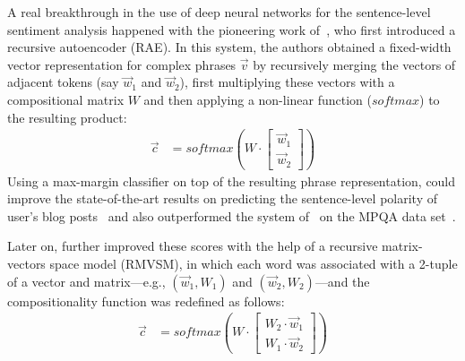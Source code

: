 A real breakthrough in the use of deep neural networks for the
sentence-level sentiment analysis happened with the pioneering work
of~\citet{Socher:11}, who first introduced a recursive autoencoder
(RAE).  In this system, the authors obtained a fixed-width vector
representation for complex phrases $\vec{v}$ by recursively merging
the vectors of adjacent tokens (say $\vec{w}_1$ and $\vec{w}_2$),
first multiplying these vectors with a compositional matrix $W$ and
then applying a non-linear function ($softmax$) to the resulting
product:
\begin{align*}
  \vec{c} &= softmax\left(W\cdot\begin{bmatrix}
  \vec{w}_1\\
  \vec{w}_2
  \end{bmatrix}\right)
\end{align*}
Using a max-margin classifier on top of the resulting phrase
representation, \citet{Socher:11} could improve the state-of-the-art
results on predicting the sentence-level polarity of user's blog
posts~\cite{Potts:10} and also outperformed the system
of~\citet{Nasukawa:03} on the MPQA data set~\cite{Wiebe:05}.

Later on, \citet{Socher:12} further improved these scores with the
help of a recursive matrix-vectors space model (RMVSM), in which each
word was associated with a 2-tuple of a vector and matrix---e.g.,
$(\vec{w}_1, W_1)$ and $(\vec{w}_2, W_2)$---and the compositionality
function was redefined as follows:
\begin{align*}
  \vec{c} &= softmax\left(W\cdot\begin{bmatrix}
  W_2\cdot\vec{w}_1\\
  W_1\cdot\vec{w}_2
  \end{bmatrix}\right)
\end{align*}

\citet{Wang:15}


\todo[inline]{}

